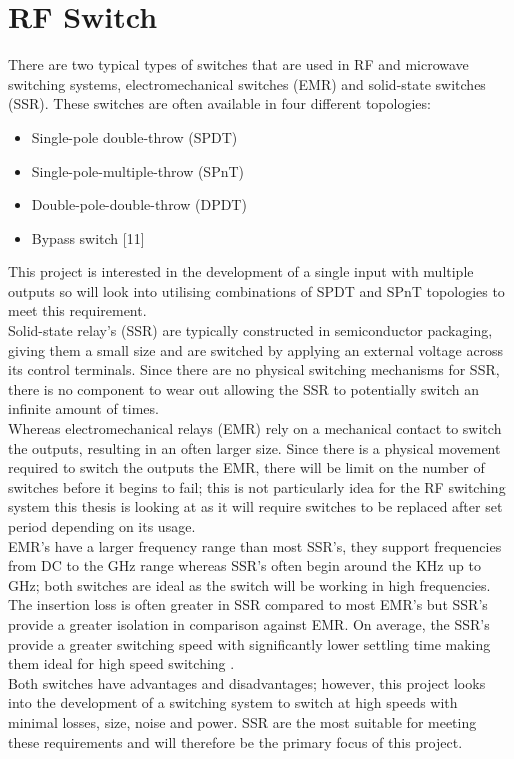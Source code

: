 \documentclass[12pt,openany,a4paper]{book}
\begin{document}
\section{RF Switch}
There are two typical types of switches that are used in RF and microwave switching systems, electromechanical switches (EMR) and solid-state switches (SSR). These switches are often available in four different topologies:
\begin{itemize}
	\setlength\itemsep{-0.5em}
	\item Single-pole double-throw (SPDT)
	\item Single-pole-multiple-throw (SPnT)
	\item Double-pole-double-throw (DPDT)
	\item Bypass switch [11]
\end{itemize}
This project is interested in the development of a single input with multiple outputs so will look into utilising combinations of SPDT and SPnT topologies to meet this requirement. \\
Solid-state relay's (SSR) are typically constructed in semiconductor packaging, giving them a small size and are switched by applying an external voltage across its control terminals. Since there are no physical switching mechanisms for SSR, there is no component to wear out allowing the SSR to potentially switch an infinite amount of times. \\
Whereas electromechanical relays (EMR) rely on a mechanical contact to switch the outputs, resulting in an often larger size. Since there is a physical movement required to switch the outputs the EMR, there will be limit on the number of switches before it begins to fail; this is not particularly idea for the RF switching system this thesis is looking at as it will require switches to be replaced after set period depending on its usage. \\
EMR's have a larger frequency range than most SSR's, they support frequencies from DC to the GHz range whereas SSR's often begin around the KHz up to GHz; both switches are ideal as the switch will be working in high frequencies. The insertion loss is often greater in SSR compared to most EMR's but SSR's provide a greater isolation in comparison against EMR. On average, the SSR's provide a greater switching speed with significantly lower settling time making them ideal for high speed switching \cite{ref5}. \\
Both switches have advantages and disadvantages; however, this project looks into the development of a switching system to switch at high speeds with minimal losses, size, noise and power. SSR are the most suitable for meeting these requirements and will therefore be the primary focus of this project.
\end{document}
